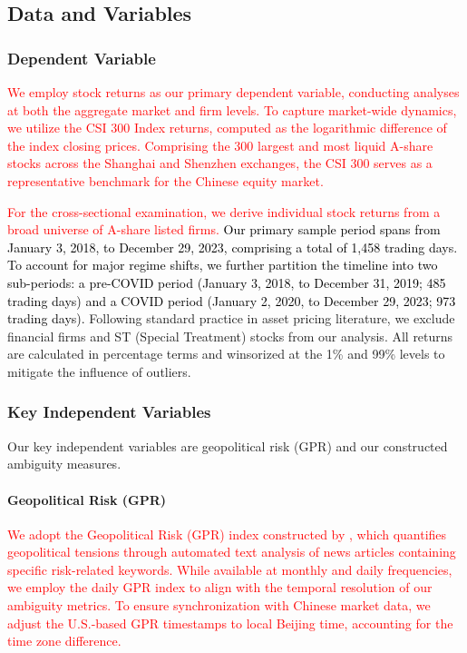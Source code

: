 \documentclass[preprint,12pt,authoryear]{elsarticle}
\begin{document}
\subsection{Data and Variables}

\subsubsection{Dependent Variable}

\textcolor{red}{We employ stock returns as our primary dependent variable, conducting analyses at both the aggregate market and firm levels. To capture market-wide dynamics, we utilize the CSI 300 Index returns, computed as the logarithmic difference of the index closing prices. Comprising the 300 largest and most liquid A-share stocks across the Shanghai and Shenzhen exchanges, the CSI 300 serves as a representative benchmark for the Chinese equity market.}

\textcolor{red}{For the cross-sectional examination, we derive individual stock returns from a broad universe of A-share listed firms.} \textcolor{black}{Our primary sample period spans from January 3, 2018, to December 29, 2023, comprising a total of 1,458 trading days. To account for major regime shifts, we further partition the timeline into two sub-periods: a pre-COVID period (January 3, 2018, to December 31, 2019; 485 trading days) and a COVID period (January 2, 2020, to December 29, 2023; 973 trading days).} Following standard practice in asset pricing literature, we exclude financial firms and ST (Special Treatment) stocks from our analysis. All returns are calculated in percentage terms and winsorized at the 1\% and 99\% levels to mitigate the influence of outliers.



\subsubsection{Key Independent Variables}

Our key independent variables are geopolitical risk (GPR) and our constructed ambiguity measures.

\paragraph{Geopolitical Risk (GPR)}
\textcolor{red}{We adopt the Geopolitical Risk (GPR) index constructed by \citet{Caldara2022}, which quantifies geopolitical tensions through automated text analysis of news articles containing specific risk-related keywords. While available at monthly and daily frequencies, we employ the daily GPR index to align with the temporal resolution of our ambiguity metrics. To ensure synchronization with Chinese market data, we adjust the U.S.-based GPR timestamps to local Beijing time, accounting for the time zone difference.}
\end{document}
